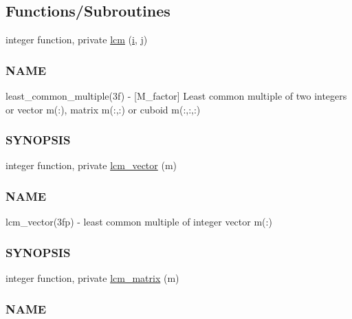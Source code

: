 \subsection*{Functions/\+Subroutines}
\begin{DoxyCompactItemize}
\item 
integer function, private \hyperlink{namespacem__factor_a363e0b451d99647a6230a308ffccc73c}{lcm} (\hyperlink{intro__blas1_83_8txt_a8ba82a50c0c2c12d5f6a77f7e4651c0b}{i}, \hyperlink{exit_87_8txt_a8921ef29c441e427867c54bd3b2462ba}{j})
\begin{DoxyCompactList}\small\item\em \subsubsection*{N\+A\+ME}

least\+\_\+common\+\_\+multiple(3f) -\/ \mbox{[}M\+\_\+factor\mbox{]} Least common multiple of two integers or vector m(\+:), matrix m(\+:,\+:) or cuboid m(\+:,\+:,\+:) \subsubsection*{S\+Y\+N\+O\+P\+S\+IS}\end{DoxyCompactList}\item 
integer function, private \hyperlink{namespacem__factor_a3802e87d5a394888aefc2d6cf496509f}{lcm\+\_\+vector} (m)
\begin{DoxyCompactList}\small\item\em \subsubsection*{N\+A\+ME}

lcm\+\_\+vector(3fp) -\/ least common multiple of integer vector m(\+:) \subsubsection*{S\+Y\+N\+O\+P\+S\+IS}\end{DoxyCompactList}\item 
integer function, private \hyperlink{namespacem__factor_af2cc63a43164bf57aedac557fafe907f}{lcm\+\_\+matrix} (m)
\begin{DoxyCompactList}\small\item\em \subsubsection*{N\+A\+ME}


\end{DoxyCompactList}
\end{DoxyCompactItemize}
